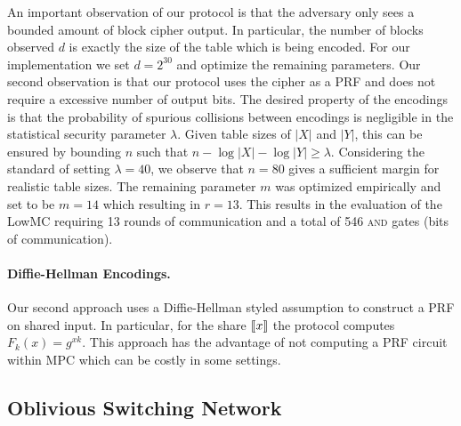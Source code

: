 An important observation of our protocol is that the adversary only sees a bounded amount of block cipher output. In particular, the number of blocks observed $d$ is exactly the size of the table which is being encoded. For our implementation we set $d=2^{30}$ and optimize the remaining parameters. Our second observation is that our protocol uses the cipher as a PRF and does not require a excessive number of output bits. The desired property of the encodings is that the probability of spurious collisions between encodings is negligible in the statistical security parameter $\lambda$. Given table sizes of $|X|$ and $|Y|$, this can be ensured by bounding $n$ such that $n-\log |X|-\log |Y|\geq \lambda$. Considering the standard of setting $\lambda=40$, we observe that $n=80$ gives a sufficient margin for realistic table sizes. The remaining parameter $m$ was optimized empirically and set to be $m=14$ which resulting in $r=13$. This results in the evaluation of the LowMC requiring 13 rounds of communication and a total of 546 \textsc{and} gates (bits of communication).



\paragraph{Diffie-Hellman Encodings.} Our second approach uses a Diffie-Hellman styled assumption to construct a PRF on shared input. In particular, for the share $\llbracket x\rrbracket$ the protocol computes $F_k(x) = g^{xk}$. This approach has the advantage of not computing a PRF circuit within MPC which can be costly in some settings.





\subsection{Oblivious Switching Network}


